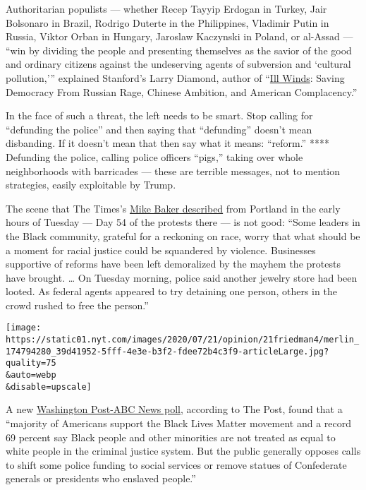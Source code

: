 Authoritarian populists --- whether Recep Tayyip Erdogan in Turkey, Jair
Bolsonaro in Brazil, Rodrigo Duterte in the Philippines, Vladimir Putin
in Russia, Viktor Orban in Hungary, Jaroslaw Kaczynski in Poland, or
al-Assad --- ``win by dividing the people and presenting themselves as
the savior of the good and ordinary citizens against the undeserving
agents of subversion and `cultural pollution,''' explained Stanford's
Larry Diamond, author of
``\href{https://diamond-democracy.stanford.edu/publications/ill-winds-saving-democracy-russian-rage-chinese-ambition-and-american-complacency}{Ill
Winds}: Saving Democracy From Russian Rage, Chinese Ambition, and
American Complacency.''

In the face of such a threat, the left needs to be smart. Stop calling
for ``defunding the police'' and then saying that ``defunding'' doesn't
mean disbanding. If it doesn't mean that then say what it means:
``reform.'' **** Defunding the police, calling police officers ``pigs,''
taking over whole neighborhoods with barricades --- these are terrible
messages, not to mention strategies, easily exploitable by Trump.

The scene that The Times's
\href{https://www.nytimes.com/2020/07/21/us/portland-protests.html}{Mike
Baker described} from Portland in the early hours of Tuesday --- Day 54
of the protests there --- is not good: ``Some leaders in the Black
community, grateful for a reckoning on race, worry that what should be a
moment for racial justice could be squandered by violence. Businesses
supportive of reforms have been left demoralized by the mayhem the
protests have brought. \ldots{} On Tuesday morning, police said another
jewelry store had been looted. As federal agents appeared to try
detaining one person, others in the crowd rushed to free the person.''

\texttt{[image: https://static01.nyt.com/images/2020/07/21/opinion/21friedman4/merlin\_174794280\_39d41952-5fff-4e3e-b3f2-fdee72b4c3f9-articleLarge.jpg?quality=75\\\&auto=webp\\\&disable=upscale]}

A new \href{https://wapo.st/3jiOiyp}{Washington Post-ABC News poll,}
according to The Post, found that a ``majority of Americans support the
Black Lives Matter movement and a record 69 percent say Black people and
other minorities are not treated as equal to white people in the
criminal justice system. But the public generally opposes calls to shift
some police funding to social services or remove statues of Confederate
generals or presidents who enslaved people.''

